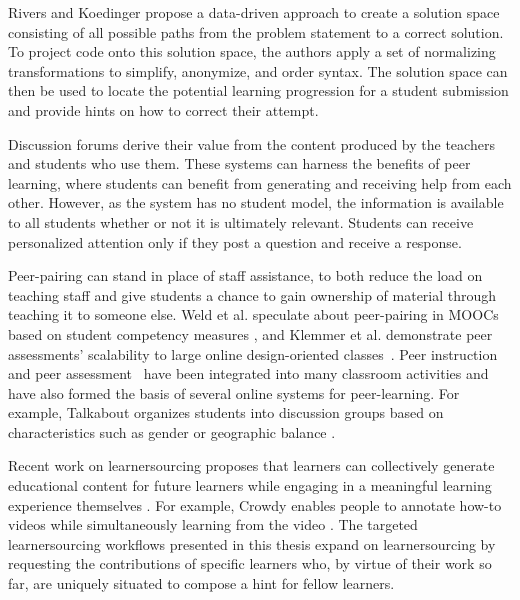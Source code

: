 Rivers and Koedinger \cite{riversaied} propose a data-driven approach to create a solution space consisting of all possible paths from the problem statement to a correct solution. To project code onto this solution space, the authors apply a set of normalizing transformations to simplify, anonymize, and order syntax. The solution space can then be used to locate the potential learning progression for a student submission and provide hints on how to correct their attempt. %

Discussion forums derive their value from the content produced by the teachers and students who use them. These systems can harness the benefits of peer learning, where students can benefit from generating and receiving help from each other. However, as the system has no student model, the information is available to all students whether or not it is ultimately relevant. Students can receive personalized attention only if they post a question and receive a response. 

Peer-pairing can stand in place of staff assistance, to both reduce the load on teaching staff and give students a chance to gain ownership of material through teaching it to someone else. Weld et al. speculate about peer-pairing in MOOCs based on student competency measures \cite{WeldHcomp12}, and Klemmer et al. demonstrate peer assessments' scalability to large online design-oriented classes~\cite{Klemmer}. Peer instruction~\cite{mazur} and peer assessment~\cite{peerassessment} have been integrated into many classroom activities and have also formed the basis of several online systems for peer-learning. For example, Talkabout organizes students into discussion groups based on characteristics such as gender or geographic balance \cite{talkabout}.

Recent work on learnersourcing proposes that learners can collectively generate educational content for future learners while engaging in a meaningful learning experience themselves \cite{kim2013learnersourcing,weir2015,mitros2015}. For example, Crowdy enables people to annotate how-to videos while simultaneously learning from the video \cite{weir2015}. The targeted learnersourcing workflows presented in this thesis expand on learnersourcing by requesting the contributions of specific learners who, by virtue of their work so far, are uniquely situated to compose a hint for fellow learners. %


